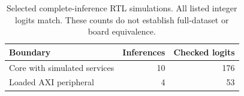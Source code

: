 \begin{table}
\caption{Selected complete-inference RTL simulations. All listed integer logits match. These counts do not establish full-dataset or board equivalence.}
\label{tab:rtl-coverage}
\centering
\begin{tabular}{lrr}
\toprule
Boundary & Inferences & Checked logits \\
\midrule
Core with simulated services & 10 & 176 \\
Loaded AXI peripheral & 4 & 53 \\
\bottomrule
\end{tabular}
\end{table}
